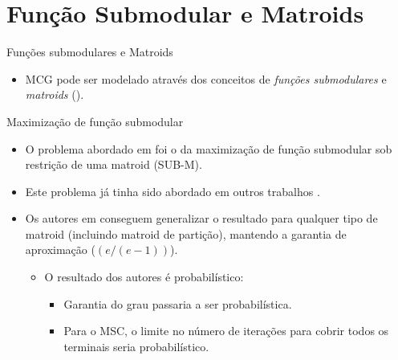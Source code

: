 \documentclass[10pt]{beamer}
\begin{document}
\section{Função Submodular e Matroids}

\begin{frame}{Funções submodulares e Matroids}
\begin{itemize}
  \item MCG pode ser modelado através dos conceitos de \emph{funções submodulares} e \emph{matroids} (\cite{Calinescu2011}).
\end{itemize}
\hypertarget{matroid}{}
\hyperlink{matroid_slide}{}
\end{frame}

\begin{frame}{Maximização de função submodular}
\begin{itemize}
  \item <1-> O problema abordado em \cite{Calinescu2011} foi o da maximização de função submodular sob restrição de uma matroid (SUB-M).
  \item <2-> Este problema já tinha sido abordado em outros trabalhos \cite{Nemhauser1978,Fisher1978}.
  \item <3-> Os autores em \cite{Calinescu2011} conseguem generalizar o resultado para qualquer tipo de matroid (incluindo matroid de partição), mantendo a garantia de 
aproximação ($(e/(e-1))$).
  \begin{itemize}
    \item <4-> O resultado dos autores é probabilístico:
    \begin{itemize}
      \item <5-> Garantia do grau passaria a ser probabilística.
      \item <6-> Para o MSC, o limite no número de iterações para cobrir todos os terminais seria probabilístico.
    \end{itemize}
  \end{itemize}
\end{itemize}
\end{frame}
\end{document}
